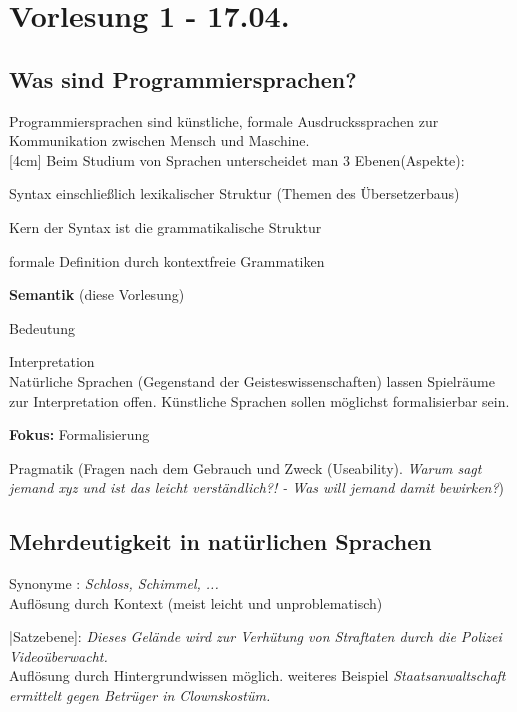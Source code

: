 \section{Vorlesung 1 - 17.04.}
\subsection{Was sind Programmiersprachen?}
Programmiersprachen sind künstliche, formale Ausdruckssprachen zur Kommunikation zwischen Mensch und Maschine.\\
[4cm]
Beim Studium von Sprachen unterscheidet man 3 Ebenen(Aspekte):\\
\begin{compactitem}
	\item Syntax einschließlich lexikalischer Struktur (Themen des Übersetzerbaus)\\
	\begin{compactitem}
		\item Kern der Syntax ist die grammatikalische Struktur\\
		\item formale Definition durch kontextfreie Grammatiken\\
	\end{compactitem}
	\item \textbf{Semantik} (diese Vorlesung)\\
	\begin{compactitem}
		\item Bedeutung\\
		\item Interpretation\\
		Natürliche Sprachen (Gegenstand der Geisteswissenschaften) lassen Spielräume zur Interpretation offen. Künstliche Sprachen sollen möglichst formalisierbar sein.
		\item \textbf{Fokus:} Formalisierung
	\end{compactitem}
	\item Pragmatik (Fragen nach dem Gebrauch und Zweck (Useability). \emph{Warum sagt jemand xyz und ist das leicht verständlich?! - Was will jemand damit bewirken?})
\end{compactitem}
\subsection{Mehrdeutigkeit in natürlichen Sprachen}
\begin{compactitem}
	\item [Synonyme]: \emph{Schloss, Schimmel, ...}\\
	Auflösung durch Kontext (meist leicht und unproblematisch)
	\item |Satzebene]: \emph{Dieses Gelände wird zur Verhütung von Straftaten durch die Polizei Videoüberwacht.}\\
	Auflösung durch Hintergrundwissen möglich. 
	weiteres Beispiel \emph{Staatsanwaltschaft ermittelt gegen Betrüger in Clownskostüm.} 
\end{compactitem}

